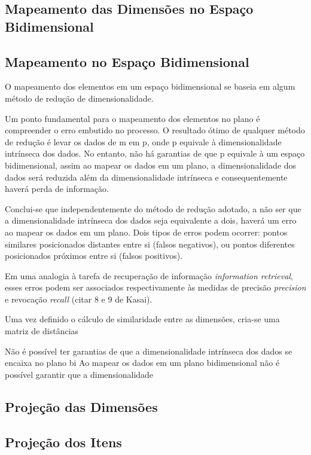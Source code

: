 \subsection{Mapeamento das Dimensões no Espaço Bidimensional}
\subsection{Mapeamento no Espaço Bidimensional}

O mapeamento dos elementos em um espaço bidimensional se baseia em algum método de redução de dimensionalidade. 

Um ponto fundamental para o mapeamento dos elementos no plano é compreender o erro embutido no processo. O resultado ótimo de qualquer método de redução é levar os dados de m em p, onde p equivale à dimensionalidade intrínseca dos dados. No entanto,  não há garantias de que p equivale à um espaço bidimensional, assim ao mapear os dados em um plano, a dimensionalidade dos dados será reduzida além da dimensionalidade intrínseca e consequentemente haverá perda de informação.

Conclui-se que independentemente do método de redução adotado, a não ser que a dimensionalidade intrínseca dos dados seja equivalente a dois, haverá um erro ao mapear os dados em um plano. Dois tipos de erros podem ocorrer: pontos similares posicionados distantes entre si (falsos negativos), ou pontos diferentes posicionados próximos entre si (falsos positivos). 

Em uma analogia à tarefa de recuperação de informação \emph{information retrieval}, esses erros podem ser associados respectivamente às medidas de precisão \emph{precision} e revocação \emph{recall} (citar 8 e 9 de Kasai).

Uma vez definido o cálculo de similaridade entre as dimensões, cria-se uma matriz de distâncias 

Não é possível ter garantias de que a dimensionalidade intrínseca dos dados se encaixa no plano bi
Ao mapear os dados em um plano bidimensional não é possível garantir que a dimensionalidade  

\subsection{Projeção das Dimensões}

\subsection{Projeção dos Itens}

